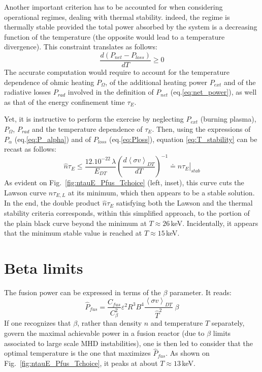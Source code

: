 Another important criterion has to be accounted for when considering operational regimes, dealing with thermal stability. indeed, the regime is thermally stable provided the total power absorbed by the system is a decreasing function of the temperature (the opposite would lead to a temperature divergence). This constraint translates as follows:
\begin{equation}
  \frac{d (P_{net} - P_{loss})}{dT} \geq 0
  \label{eq:T_stability}
\end{equation}
The accurate computation would require to account for the temperature dependence of ohmic heating $P_\Omega$, of the additional heating power $P_{ext}$ and of the radiative losses $P_{rad}$ involved in the definition of $P_{net}$ (eq.\ref{eq:net_power}), as well as that of the energy confinement time $\tau_E$.

Yet, it is instructive to perform the exercise by neglecting $P_{ext}$ (burning plasma), $P_\Omega$, $P_{rad}$ and the temperature dependence of $\tau_E$. Then, using the expressions of $P_\alpha$ (eq.\ref{eq:P_alpha}) and of $P_{loss}$ (eq.\ref{eq:Ploss}), equation \ref{eq:T_stability} can be recast as follows:
\begin{equation}
 \hat n \tau_E \leq \frac{12.10^{-22}\, \lambda}{E_{DT}} 
    \left( \frac{d \left< \sigma v \right>_{DT}}{dT} \right)^{-1} \doteq \left.\hat n \tau_E\right|_{stab}
\label{eq:T_stability_2}
\end{equation}
As evident on Fig.~\ref{fig:ntauE_Pfus_Tchoice} (left, inset), this curve cuts the Lawson curve $\hat n\tau_{E,L}$ at its minimum, which then appears to be a stable solution. In the end, the double product $\hat n\tau_{E}$ satisfying both the Lawson and the thermal stability criteria corresponds, within this simplified approach, to the portion of the plain black curve beyond the minimum at $T\approx 26\,$keV. 
Incidentally, it appears that the minimum stable value is reached at $T\approx 15\,$keV. 


\section{Beta limits}

The fusion power can be expressed in terms of the $\beta$ parameter. It reads:
\begin{equation}
\hat P_{fus} = \frac{C_{fus}}{C_\beta^2} \varepsilon^2 R^3 B^4 
 \frac{\left< \sigma v \right>_{DT}}{\hat T^2}\; \beta 
\end{equation}
If one recognizes that $\beta$, rather than density $n$ and temperature $T$ separately, govern the maximal achievable power in a fusion reactor (due to $\beta$ limits associated to large scale MHD instabilities), one is then led to consider that the optimal temperature is the one that maximizes $\hat P_{fus}$. As shown on Fig.~\ref{fig:ntauE_Pfus_Tchoice}, it peaks at about $T\approx 13\,$keV.


